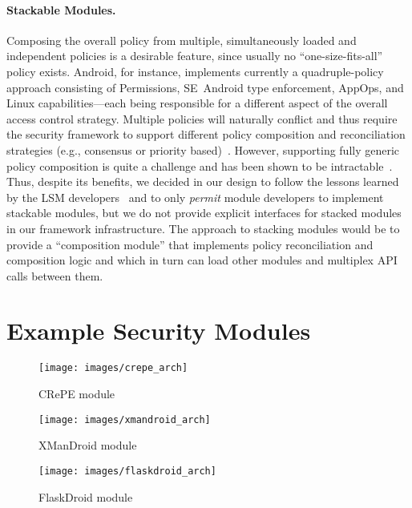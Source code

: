 \documentclass[letterpaper,twocolumn,10pt]{article}
\begin{document}
\paragraph{Stackable Modules.} Composing the overall policy from multiple, simultaneously loaded and independent policies is a desirable feature, since usually no ``one-size-fits-all'' policy exists. Android, for instance, implements currently a quadruple-policy approach consisting of Permissions, SE~Android type enforcement, AppOps, and Linux capabilities---each being responsible for a different aspect of the overall access control strategy. Multiple policies will naturally conflict and thus require the security framework to support different policy composition and reconciliation strategies (e.g., consensus or priority based)~\cite{Rao:2009:DMA:1542207.1542217,1004363}. However, supporting fully generic policy composition is quite a challenge and has been shown to be intractable~\cite{674833}. Thus, despite its benefits, we decided in our design to follow the lessons learned by the LSM developers~\cite{Wright:2002:LSM:647253.720287} and to only \emph{permit} module developers to implement stackable modules, but we do not provide explicit interfaces for stacked modules in our framework infrastructure. The approach to stacking modules would be to provide a ``composition module'' that implements policy reconciliation and composition logic and which in turn can load other modules and multiplex API calls between them.
 
\section{Example Security Modules}
\label{sec:usecases}
\begin{figure*}[t]
\centering
\begin{minipage}[b]{.38\linewidth}
  \centering
  \texttt{[image: images/crepe\_arch]}
  \caption{CRePE module}
  \label{fig:crepemodule}
\end{minipage}
\hfill
\begin{minipage}[b]{.3\linewidth}
\centering
  \texttt{[image: images/xmandroid\_arch]}
  \caption{XManDroid module}
  \label{fig:xmandroidmodule}
\end{minipage}
\hfill
\begin{minipage}[b]{.3\linewidth}
  \centering
  \texttt{[image: images/flaskdroid\_arch]}
  \caption{FlaskDroid module}
  \label{fig:flaskdroidmodule}
\end{minipage}
\end{figure*}
\end{document}
